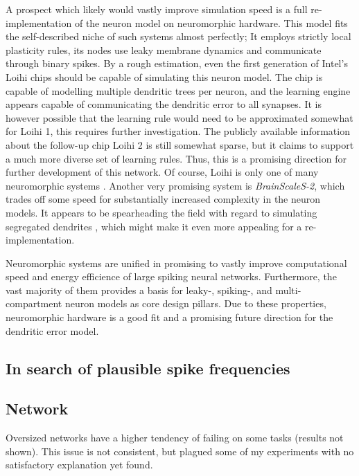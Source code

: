 A prospect which likely would vastly improve simulation speed is a full re-implementation of the neuron model on
neuromorphic hardware. This model fits the self-described niche of such systems almost perfectly; It employs strictly
local plasticity rules, its nodes use leaky membrane dynamics and communicate through binary spikes. By a rough
estimation, even the first generation of Intel's Loihi chips \citep{davies2018loihi} should be capable of simulating
this neuron model. The chip is capable of modelling multiple dendritic trees per neuron, and the learning engine appears
capable of communicating the dendritic error to all synapses. It is however possible that the learning rule would need
to be approximated somewhat for Loihi 1, this requires further investigation. The publicly available information about
the follow-up chip Loihi 2 \citep{Davies2021} is still somewhat sparse, but it claims to support a much more diverse set
of learning rules. Thus, this is a promising direction for further development of this network. Of course, Loihi is only
one of many neuromorphic systems \citep{rajendran2019low}. Another very promising system is \textit{BrainScaleS-2},
which trades off some speed for substantially increased complexity in the neuron models. It appears to be spearheading
the field with regard to simulating segregated dendrites \citep{Kaiser2022}, which might make it even more appealing
for a re-implementation.

Neuromorphic systems are unified in promising to vastly improve computational speed and energy efficience of large
spiking neural networks. Furthermore, the vast majority of them provides a basis for leaky-, spiking-, and
multi-compartment neuron models as core design pillars. Due to these properties, neuromorphic hardware is a good fit and
a promising future direction for the dendritic error model.






\subsection{In search of plausible spike frequencies}

\subsection*{Network}

Oversized networks have a higher tendency of failing on some tasks (results not shown). This issue is not consistent,
but plagued some of my experiments with no satisfactory explanation yet found.


